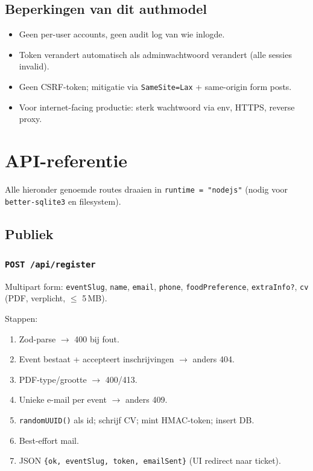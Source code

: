 \documentclass[11pt,a4paper]{report}
\begin{document}
\section{Beperkingen van dit authmodel}
\begin{itemize}[leftmargin=*]
  \item Geen per-user accounts, geen audit log van wie inlogde.
  \item Token verandert automatisch als adminwachtwoord verandert (alle sessies invalid).
  \item Geen CSRF-token; mitigatie via \texttt{SameSite=Lax} + same-origin form posts.
  \item Voor internet-facing productie: sterk wachtwoord via env, HTTPS, reverse proxy.
\end{itemize}

\chapter{API-referentie}

Alle hieronder genoemde routes draaien in \texttt{runtime = "nodejs"} (nodig voor
\texttt{better-sqlite3} en filesystem).

\section{Publiek}

\subsection{\texttt{POST /api/register}}
Multipart form:
\texttt{eventSlug}, \texttt{name}, \texttt{email}, \texttt{phone}, \texttt{foodPreference},
\texttt{extraInfo?}, \texttt{cv} (PDF, verplicht, $\le$ 5\,MB).

Stappen:
\begin{enumerate}[leftmargin=*]
  \item Zod-parse $\to$ 400 bij fout.
  \item Event bestaat + accepteert inschrijvingen $\to$ anders 404.
  \item PDF-type/grootte $\to$ 400/413.
  \item Unieke e-mail per event $\to$ anders 409.
  \item \texttt{randomUUID()} als id; schrijf CV; mint HMAC-token; insert DB.
  \item Best-effort mail.
  \item JSON \texttt{\{ok, eventSlug, token, emailSent\}} (UI redirect naar ticket).
\end{enumerate}
\end{document}
